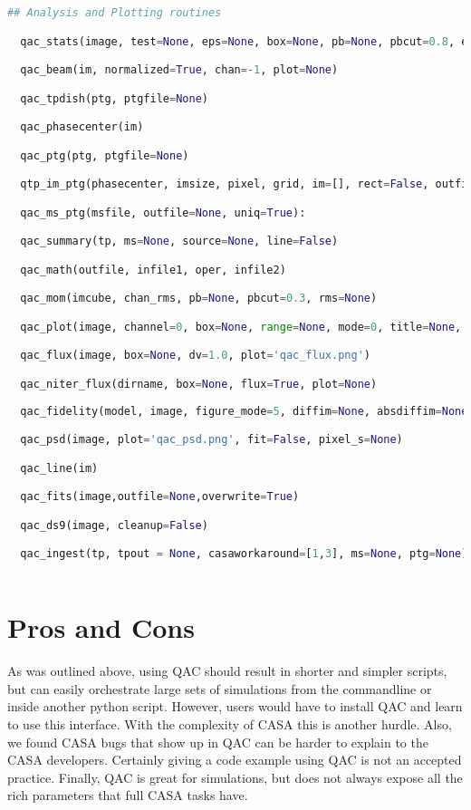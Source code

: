 \documentclass[12pt,a4paper]{article}
\begin{document}
\begin{lstlisting}[language=python]
## Analysis and Plotting routines

  qac_stats(image, test=None, eps=None, box=None, pb=None, pbcut=0.8, edge=False)

  qac_beam(im, normalized=True, chan=-1, plot=None)

  qac_tpdish(ptg, ptgfile=None)

  qac_phasecenter(im)

  qac_ptg(ptg, ptgfile=None)

  qtp_im_ptg(phasecenter, imsize, pixel, grid, im=[], rect=False, outfile=None)

  qac_ms_ptg(msfile, outfile=None, uniq=True):  

  qac_summary(tp, ms=None, source=None, line=False)

  qac_math(outfile, infile1, oper, infile2)

  qac_mom(imcube, chan_rms, pb=None, pbcut=0.3, rms=None)

  qac_plot(image, channel=0, box=None, range=None, mode=0, title=None, plot=None)

  qac_flux(image, box=None, dv=1.0, plot='qac_flux.png')

  qac_niter_flux(dirname, box=None, flux=True, plot=None)
  
  qac_fidelity(model, image, figure_mode=5, diffim=None, absdiffim=None, fidelityim=None, absmodelim=None, interactive=False)

  qac_psd(image, plot='qac_psd.png', fit=False, pixel_s=None)

  qac_line(im)

  qac_fits(image,outfile=None,overwrite=True)

  qac_ds9(image, cleanup=False)

  qac_ingest(tp, tpout = None, casaworkaround=[1,3], ms=None, ptg=None)
  
\end{lstlisting}


\section{Pros and Cons}

As was outlined above, using QAC should result in shorter and simpler scripts,
but can easily orchestrate large sets of simulations
from the commandline or inside another python script.
However, users would have to install QAC and learn to use this interface.  With the complexity
of CASA this is another hurdle. Also, we found CASA bugs that show up in QAC can be harder to
explain to the CASA developers. Certainly giving a code example using QAC is not an accepted
practice. Finally, QAC is great for simulations, but does not always expose all the rich parameters
that full CASA tasks have. 
\end{document}
